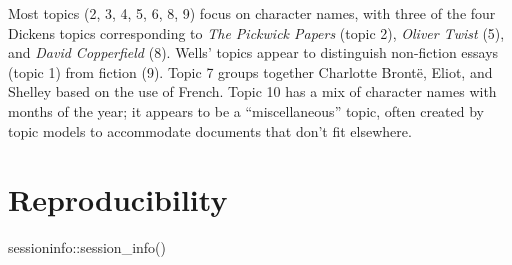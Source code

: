 \documentclass[
]{article}
\newenvironment{Shaded}{\begin{snugshade}}{\end{snugshade}}
\newcommand{\FunctionTok}[1]{\textcolor[rgb]{0.28,0.35,0.67}{#1}}
\newcommand{\NormalTok}[1]{\textcolor[rgb]{0.00,0.23,0.31}{#1}}
\newcommand{\SpecialCharTok}[1]{\textcolor[rgb]{0.37,0.37,0.37}{#1}}
\begin{document}
Most topics (2, 3, 4, 5, 6, 8, 9) focus on character names, with three
of the four Dickens topics corresponding to \emph{The Pickwick Papers}
(topic 2), \emph{Oliver Twist} (5), and \emph{David Copperfield} (8).
Wells' topics appear to distinguish non-fiction essays (topic 1) from
fiction (9). Topic 7 groups together Charlotte Brontë, Eliot, and
Shelley based on the use of French. Topic 10 has a mix of character
names with months of the year; it appears to be a ``miscellaneous''
topic, often created by topic models to accommodate documents that don't
fit elsewhere.

\hypertarget{reproducibility}{%
\section{Reproducibility}\label{reproducibility}}

\begin{Shaded}
\begin{Highlighting}[]
\NormalTok{sessioninfo}\SpecialCharTok{::}\FunctionTok{session\_info}\NormalTok{()}
\end{Highlighting}
\end{Shaded}
\end{document}
